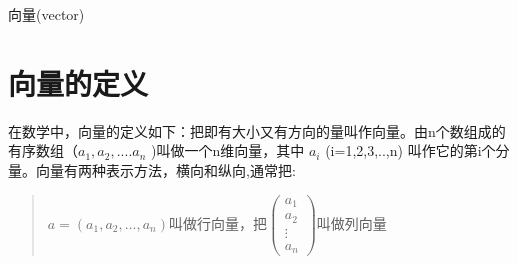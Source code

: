 \documentclass[a4paper,10pt]{article}
\begin{document}
\begin{CJK}{UTF8}{song}
\begin{center}
\Large 向量(vector)
\end{center}
\section{向量的定义}
在数学中，向量的定义如下：把即有大小又有方向的量叫作向量。由n个数组成的有序数组（$a_{1},a_{2},....a_{n}$ )叫做一个n维向量，其中 $a_i$ (i=1,2,3,..,n) 叫作它的第i个分量。向量有两种表示方法，横向和纵向,通常把:
\begin{quote}
$a=(a_1,a_2,...,a_n)$叫做行向量，把$\left( \begin{array}{c} a_1 \\ a_2 \\ \vdots{} \\ a_n \end{array} \right)$叫做列向量
\end{quote}

\end{CJK}
\end{document}

